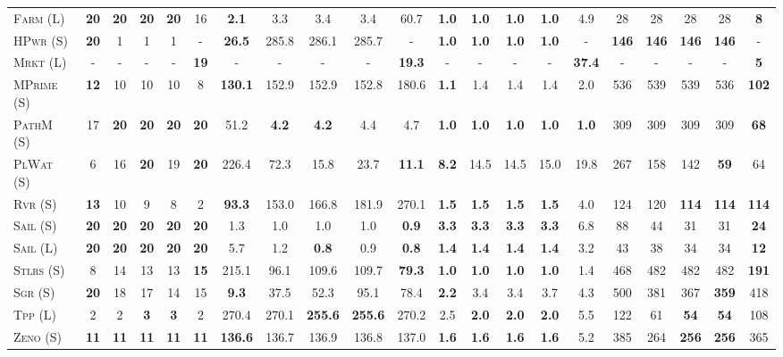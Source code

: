 \begin{table}[tb]
{\begin{tabular}{|l||ccccc||ccccc||ccccc||ccccc||}
\textsc{Farm} (L)&\textbf{20}&\textbf{20}&\textbf{20}&\textbf{20}&16&\textbf{2.1}&3.3&3.4&3.4&60.7&\textbf{1.0}&\textbf{1.0}&\textbf{1.0}&\textbf{1.0}&4.9&28&28&28&28&\textbf{8}\\
\textsc{HPwr} (S)&\textbf{20}&1&1&1&-&\textbf{26.5}&285.8&286.1&285.7&-&\textbf{1.0}&\textbf{1.0}&\textbf{1.0}&\textbf{1.0}&-&\textbf{146}&\textbf{146}&\textbf{146}&\textbf{146}&-\\
\textsc{Mrkt} (L)&-&-&-&-&\textbf{19}&-&-&-&-&\textbf{19.3}&-&-&-&-&\textbf{37.4}&-&-&-&-&\textbf{5}\\
\textsc{MPrime} (S)&\textbf{12}&10&10&10&8&\textbf{130.1}&152.9&152.9&152.8&180.6&\textbf{1.1}&1.4&1.4&1.4&2.0&536&539&539&536&\textbf{102}\\
\textsc{PathM} (S)&17&\textbf{20}&\textbf{20}&\textbf{20}&\textbf{20}&51.2&\textbf{4.2}&\textbf{4.2}&4.4&4.7&\textbf{1.0}&\textbf{1.0}&\textbf{1.0}&\textbf{1.0}&\textbf{1.0}&309&309&309&309&\textbf{68}\\
\textsc{PlWat} (S)&6&16&\textbf{20}&19&\textbf{20}&226.4&72.3&15.8&23.7&\textbf{11.1}&\textbf{8.2}&14.5&14.5&15.0&19.8&267&158&142&\textbf{59}&64\\
\textsc{Rvr} (S)&\textbf{13}&10&9&8&2&\textbf{93.3}&153.0&166.8&181.9&270.1&\textbf{1.5}&\textbf{1.5}&\textbf{1.5}&\textbf{1.5}&4.0&124&120&\textbf{114}&\textbf{114}&\textbf{114}\\
\textsc{Sail} (S)&\textbf{20}&\textbf{20}&\textbf{20}&\textbf{20}&\textbf{20}&1.3&1.0&1.0&1.0&\textbf{0.9}&\textbf{3.3}&\textbf{3.3}&\textbf{3.3}&\textbf{3.3}&6.8&88&44&31&31&\textbf{24}\\
\textsc{Sail} (L)&\textbf{20}&\textbf{20}&\textbf{20}&\textbf{20}&\textbf{20}&5.7&1.2&\textbf{0.8}&0.9&\textbf{0.8}&\textbf{1.4}&\textbf{1.4}&\textbf{1.4}&\textbf{1.4}&3.2&43&38&34&34&\textbf{12}\\
\textsc{Stlrs} (S)&8&14&13&13&\textbf{15}&215.1&96.1&109.6&109.7&\textbf{79.3}&\textbf{1.0}&\textbf{1.0}&\textbf{1.0}&\textbf{1.0}&1.4&468&482&482&482&\textbf{191}\\
\textsc{Sgr} (S)&\textbf{20}&18&17&14&15&\textbf{9.3}&37.5&52.3&95.1&78.4&\textbf{2.2}&3.4&3.4&3.7&4.3&500&381&367&\textbf{359}&418\\
\textsc{Tpp} (L)&2&2&\textbf{3}&\textbf{3}&2&270.4&270.1&\textbf{255.6}&\textbf{255.6}&270.2&2.5&\textbf{2.0}&\textbf{2.0}&\textbf{2.0}&5.5&122&61&\textbf{54}&\textbf{54}&108\\
\textsc{Zeno} (S)&\textbf{11}&\textbf{11}&\textbf{11}&\textbf{11}&\textbf{11}&\textbf{136.6}&136.7&136.9&136.8&137.0&\textbf{1.6}&\textbf{1.6}&\textbf{1.6}&\textbf{1.6}&5.2&385&264&\textbf{256}&\textbf{256}&365\\

\end{tabular}}
\end{table}
